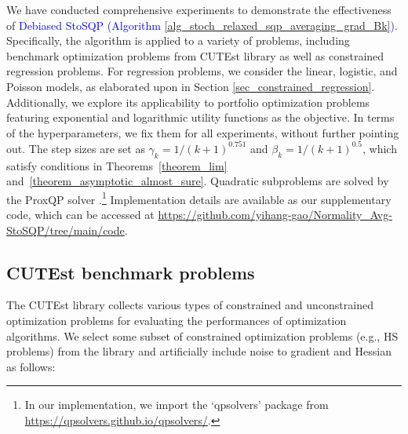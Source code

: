 \documentclass[aos]{imsart}
\numberwithin{equation}{section}
\theoremstyle{plain}
\newcommand{\michael}[1]{\textcolor{red}{Michael:\ #1}}
\newcommand{\yihang}[1]{\textcolor{blue}{Yihang:\ #1}}
\begin{document}
We have conducted comprehensive experiments to demonstrate the effectiveness of \textcolor{blue}{Debiased StoSQP (Algorithm \ref{alg_stoch_relaxed_sqp_averaging_grad_Bk})}. 
Specifically, the algorithm 
is applied to a variety of problems, including benchmark optimization problems from CUTEst library \cite{gould2015cutest, fowkes2022pycutest} as well as constrained regression problems. 
For regression problems, we consider the linear, logistic, and Poisson models, as elaborated upon in Section \ref{sec_constrained_regression}. 
Additionally, we explore its applicability to portfolio optimization problems featuring exponential and logarithmic utility functions as the objective. 
In terms of the hyperparameters, we fix them for all experiments, without further pointing out. 
The step sizes are set as $\gamma_k = 1/(k+1)^{0.751}$ and $\beta_k = 1 / (k+1)^{0.5}$, which satisfy conditions in Theorems~\ref{theorem_lim} and~\ref{theorem_asymptotic_almost_sure}. 
Quadratic subproblems are solved by the ProxQP solver \cite{bambade2022prox}.\footnote{In our implementation, we import the `qpsolvers' package from \url{https://qpsolvers.github.io/qpsolvers/}.} 
Implementation details are available as our supplementary code, which can be accessed at \url{https://github.com/yihang-gao/Normality_Avg-StoSQP/tree/main/code}.


\subsection{CUTEst benchmark problems}
The CUTEst library collects various types of constrained and unconstrained optimization problems for evaluating the performances of optimization algorithms. 
We select some subset of constrained optimization problems (e.g., HS problems) from the library and artificially include noise to gradient and Hessian as follows:
\end{document}
